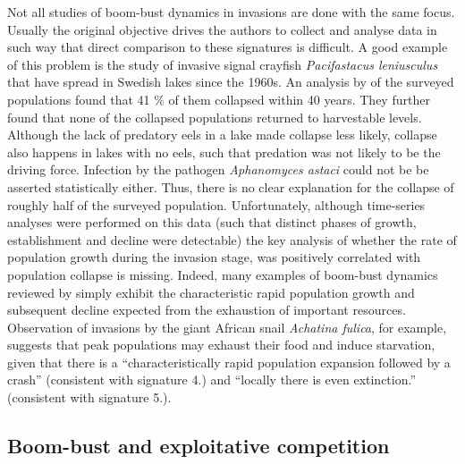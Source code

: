 \documentclass[a4paper]{report}
\begin{document}
Not all studies of boom-bust dynamics in invasions are done with the same focus. Usually the original objective drives the authors to collect and analyse data in such way that direct comparison to these signatures is difficult. A good example of this problem is the study of invasive signal crayfish \textit{Pacifastacus leniusculus} that have spread in Swedish lakes since the 1960s. An analysis by \citep{Sandstro2014} of the surveyed populations found that 41 $\%$ of them collapsed within 40 years. They further found that none of the collapsed populations returned to harvestable levels. Although the lack of predatory eels in a lake made collapse less likely, collapse also happens in lakes with no eels, such that predation was not likely to be the driving force. Infection by the pathogen \textit{Aphanomyces astaci} could not be be asserted statistically either. Thus, there is no clear explanation for the collapse of roughly half of the surveyed population. Unfortunately, although time-series analyses were performed on this data (such that distinct phases of growth, establishment and decline were detectable) the key analysis of whether the rate of population growth during the invasion stage, was positively correlated with population collapse is missing. Indeed, many examples of boom-bust dynamics reviewed by \citep{Simberloff2004} simply exhibit the characteristic rapid population growth and subsequent decline expected from the exhaustion of important resources. Observation of invasions by the giant African snail \textit{Achatina fulica}, for example, suggests that peak populations may exhaust their food and induce starvation, given that there is a “characteristically rapid population expansion followed by a crash” (consistent with signature 4.) and “locally there is even extinction.” (consistent with signature 5.).\\

\subsection{Boom-bust and exploitative competition}
\end{document}
